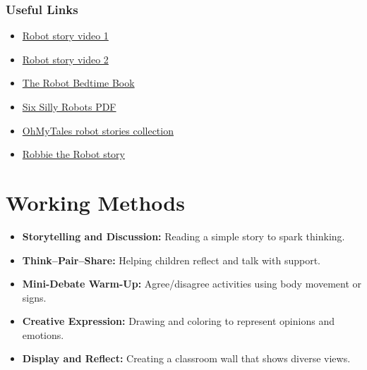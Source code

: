 \documentclass[11pt, a4paper]{article}
\begin{document}
\subsubsection*{Useful Links}
\begin{itemize}
    \item \href{https://www.youtube.com/watch?v=l25nYpnXsZ4&utm_source=chatgpt.com}{Robot story video 1}
    \item \href{https://www.youtube.com/watch?v=_CP62grb3-c&utm_source=chatgpt.com}{Robot story video 2}
    \item \href{https://www.freechildrenstories.com/the-robot-bedtime-book-1?utm_source=chatgpt.com}{The Robot Bedtime Book}
    \item \href{https://www.mathlearningcenter.org/sites/default/files/pdfs/stories/brpk-7mar-3sixsillyrobots.pdf?utm_source=chatgpt.com}{Six Silly Robots PDF}
    \item \href{https://www.ohmytales.com/t/robot/?utm_source=chatgpt.com}{OhMyTales robot stories collection}
    \item \href{https://www.storyjumper.com/book/read/21812868/ROBBIE-THE-ROBOT?utm_source=chatgpt.com}{Robbie the Robot story}
\end{itemize}

\section{Working Methods}
\begin{itemize}
    \item \textbf{Storytelling and Discussion:} Reading a simple story to spark thinking.
    \item \textbf{Think--Pair--Share:} Helping children reflect and talk with support.
    \item \textbf{Mini-Debate Warm-Up:} Agree/disagree activities using body movement or signs.
    \item \textbf{Creative Expression:} Drawing and coloring to represent opinions and emotions.
    \item \textbf{Display and Reflect:} Creating a classroom wall that shows diverse views.
\end{itemize}
\end{document}
